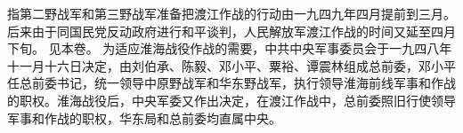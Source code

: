 \begin{maonote}
指第二野战军和第三野战军准备把渡江作战的行动由一九四九年四月提前到三月。后来由于同国民党反动政府进行和平谈判，人民解放军渡江作战的时间又延至四月下旬。
见本卷。
为适应淮海战役作战的需要，中共中央军事委员会于一九四八年十一月十六日决定，由刘伯承、陈毅、邓小平、粟裕、谭震林组成总前委，邓小平任总前委书记，统一领导中原野战军和华东野战军，执行领导淮海前线军事和作战的职权。淮海战役后，中央军委又作出决定，在渡江作战中，总前委照旧行使领导军事和作战的职权，华东局和总前委均直属中央。
\end{maonote}
